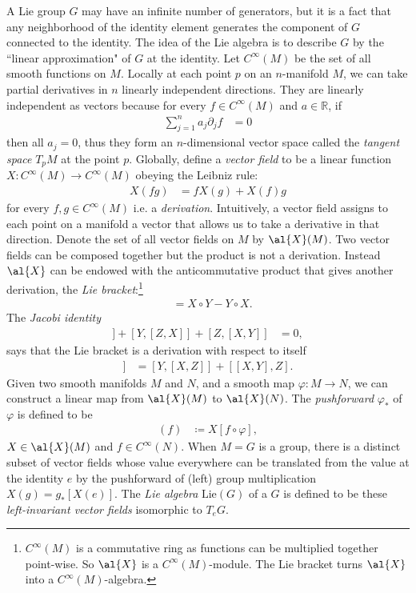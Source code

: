 A Lie group $G$ may have an infinite number of generators, but it is a fact that any neighborhood of the identity element generates the component of $G$ connected to the identity. The idea of the Lie algebra is to describe $G$ by the ``linear approximation" of $G$ at the identity. Let $C^{\infty}(M)$ be the set of all smooth functions on $M$. Locally at each point $p$ on an $n$-manifold $M$, we can take partial derivatives in $n$ linearly independent directions. They are linearly independent as vectors because for every $f \in C^{\infty}(M)$ and $a \in \mathbb{R}$, if
\begin{align}
\sum_{j=1}^n a_j \partial_j f &= 0
\end{align}
then all $a_j=0$, thus they form an $n$-dimensional vector space called the \emph{tangent space} $T_p M$ at the point $p$. Globally, define a \emph{vector field} to be a linear function $X:C^{\infty}(M) \to C^{\infty}(M)$ obeying the Leibniz rule:
\begin{align}
X(fg) &= f X(g) + X(f) g
\end{align}
for every $f,g \in C^{\infty}(M)$ i.e. a \emph{derivation}. Intuitively, a vector field assigns to each point on a manifold a vector that allows us to take a derivative in that direction. Denote the set of all vector fields on $M$ by $\al{X}(M)$. Two vector fields can be composed together but the product is not a derivation. Instead $\al{X}$ can be endowed with the anticommutative product that gives another derivation, the \emph{Lie bracket}:\footnote{$C^{\infty}(M)$ is a commutative ring as functions can be multiplied together point-wise. So $\al{X}$ is a $C^{\infty}(M)$-module. The Lie bracket turns $\al{X}$ into a $C^{\infty}(M)$-algebra.}
\begin{align}
[X,Y] &= X \circ Y-Y \circ X.
\end{align}
The \emph{Jacobi identity}
\begin{align}
[X,[Y,Z]] + [Y,[Z,X]] + [Z,[X,Y]] &= 0,
\end{align}
says that the Lie bracket is a derivation with respect to itself
\begin{align}
	[X,[Y,Z]] &= [Y,[X,Z]] + [[X,Y],Z].
\end{align}
Given two smooth manifolds $M$ and $N$, and a smooth map $\varphi: M \to N$, we can construct a linear map from $\al{X}(M)$ to $\al{X}(N)$. The \emph{pushforward} $\varphi_*$ of $\varphi$ is defined to be
\begin{align}
[\varphi_*(X)](f) &\coloneqq  X[f \circ \varphi],
\end{align}
$X \in \al{X}(M)$ and $f \in C^{\infty}(N)$. When $M = G$ is a group, there is a distinct subset of vector fields whose value everywhere can be translated from the value at the identity $e$ by the pushforward of (left) group multiplication $X(g) = g_* [X(e)]$. The \emph{Lie algebra} $\text{Lie}(G)$ of a $G$ is defined to be these \emph{left-invariant vector fields} isomorphic to $T_e G$.

